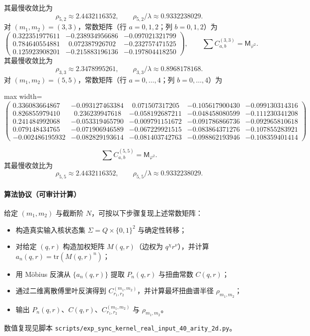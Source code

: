 其最慢收敛比为
\[
\rho_{5,2}\approx 2.4432116352,\qquad \rho_{5,2}/\lambda\approx 0.9332238029.
\]
对 $(m_1,m_2)=(3,3)$，常数矩阵（行 $a=0,1,2$；列 $b=0,1,2$）为
\[
\begin{pmatrix}
0.322351977611 & -0.238934956686 & -0.097021321799\\
0.784640554881 & \ \ 0.072387926702 & -0.232757471525\\
0.125923908201 & -0.215883196136 & -0.197804418250
\end{pmatrix},
\qquad
\sum C_{a,b}^{(3,3)}=\mathsf{M}_{\varphi^2}.
\]
其最慢收敛比为
\[
\rho_{3,3}\approx 2.3478995261,\qquad \rho_{3,3}/\lambda\approx 0.8968178168.
\]
对 $(m_1,m_2)=(5,5)$，常数矩阵（行 $a=0,\dots,4$；列 $b=0,\dots,4$）为
\begin{center}
\begin{adjustbox}{max width=\linewidth}
\(\begin{pmatrix}
0.336083664867 & -0.093127463384 & \ \ 0.071507317205 & -0.105617900430 & -0.099130314316\\
0.826855979410 & \ \ 0.236239947618 & -0.058192687211 & -0.048458080599 & -0.111230341208\\
0.241484992068 & -0.053319465790 & -0.009791151672 & -0.091786866736 & -0.092965810618\\
0.079148434765 & -0.071906946589 & -0.067229921515 & -0.083864371276 & -0.107855283921\\
-0.002486195932 & -0.082829193614 & -0.081403742763 & -0.098862193946 & -0.108359401414
\end{pmatrix}\)
\end{adjustbox}
\end{center}
\[
\sum C_{a,b}^{(5,5)}=\mathsf{M}_{\varphi^2}.
\]
其最慢收敛比为
\[
\rho_{5,5}\approx 2.4432116352,\qquad \rho_{5,5}/\lambda\approx 0.9332238029.
\]
\paragraph{算法协议（可审计计算）}
给定 $(m_1,m_2)$ 与截断阶 $N$，可按以下步骤复现上述常数矩阵：
\begin{itemize}
  \item 构造真实输入核状态集 $\Sigma=Q\times\{0,1\}^2$ 与确定性转移；
  \item 对给定 $(q,r)$ 构造加权矩阵 $M(q,r)$（边权为 $q^\chi r^\nu$），并计算 $a_n(q,r)=\mathrm{tr}(M(q,r)^n)$；
  \item 用 Möbius 反演从 $\{a_n(q,r)\}$ 提取 $P_n(q,r)$ 与扭曲常数 $C(q,r)$；
  \item 通过二维离散傅里叶反演得到 $C_{r_1,r_2}^{(m_1,m_2)}$，并计算最坏扭曲谱半径 $\rho_{m_1,m_2}$；
  \item 输出 $P_n(q,r)$、$C(q,r)$、$C_{r_1,r_2}^{(m_1,m_2)}$ 与 $\rho_{m_1,m_2}$。
\end{itemize}
数值复现见脚本 \texttt{scripts/exp\_sync\_kernel\_real\_input\_40\_arity\_2d.py}。
